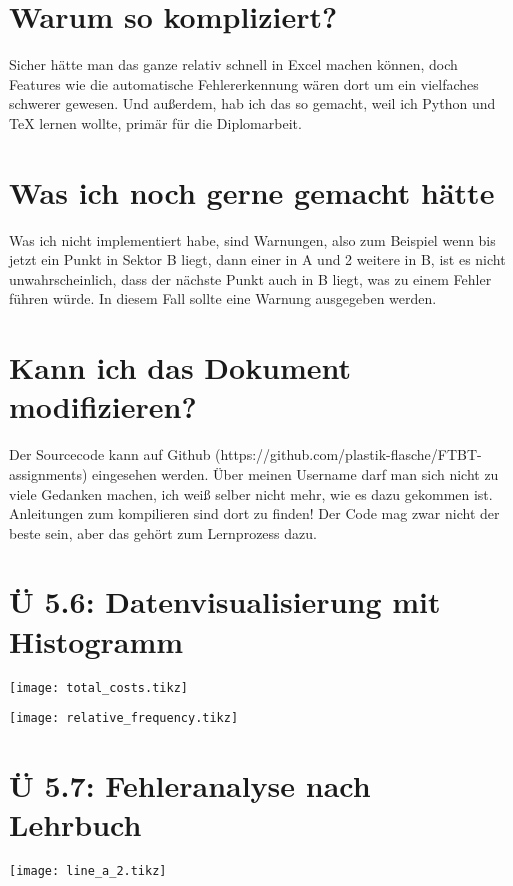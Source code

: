 \documentclass[12pt]{article}
\begin{document}
\section{Warum so kompliziert?}

Sicher hätte man das ganze relativ schnell in Excel machen können, doch Features wie die automatische Fehlererkennung wären dort um ein vielfaches schwerer gewesen. Und außerdem, hab ich das so gemacht, weil ich Python und TeX lernen wollte, primär für die Diplomarbeit.

\section{Was ich noch gerne gemacht hätte}

Was ich nicht implementiert habe, sind Warnungen, also zum Beispiel wenn bis jetzt ein Punkt in Sektor B liegt, dann einer in A und 2 weitere in B, ist es nicht unwahrscheinlich, dass der nächste Punkt auch in B liegt, was zu einem Fehler führen würde. In diesem Fall sollte eine Warnung ausgegeben werden.

\section{Kann ich das Dokument modifizieren?}

Der Sourcecode kann auf Github (https://github.com/plastik-flasche/FTBT-assignments) eingesehen werden. Über meinen Username darf man sich nicht zu viele Gedanken machen, ich weiß selber nicht mehr, wie es dazu gekommen ist. Anleitungen zum kompilieren sind dort zu finden! Der Code mag zwar nicht der beste sein, aber das gehört zum Lernprozess dazu.

\newpage

\section{Ü 5.6: Datenvisualisierung mit Histogramm}

\texttt{[image: total\_costs.tikz]}

\texttt{[image: relative\_frequency.tikz]}

\section{Ü 5.7: Fehleranalyse nach Lehrbuch}

\texttt{[image: line\_a\_2.tikz]}
\end{document}
